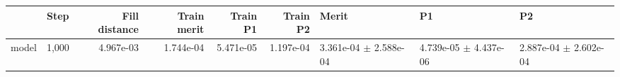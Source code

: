 \begin{tabular}{llrrrrlll}
\toprule
 & Step & Fill distance & Train merit & Train P1 & Train P2 & Merit & P1 & P2 \\
\midrule
model & 1,000 & 4.967e-03 & 1.744e-04 & 5.471e-05 & 1.197e-04 & 3.361e-04 $\pm$ 2.588e-04 & 4.739e-05 $\pm$ 4.437e-06 & 2.887e-04 $\pm$ 2.602e-04 \\
\bottomrule
\end{tabular}
